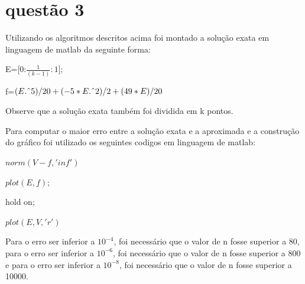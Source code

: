 \documentclass[a4paper]{article}
\begin{document}
  \section{questão 3}
  
  Utilizando os algoritmos descritos acima foi montado a solução exata em linguagem de matlab da seguinte forma:
  
  E=[0:\(\frac{1}{(k-1)}:1\)];
  
  f=\((E.\string^5)/20 +(-5*E.\string^2)/2 +(49*E)/20\) %
  
  Observe que a solução exata também foi dividida em k pontos.
  
  Para computar o maior erro entre a solução exata e a aproximada e a construção do gráfico foi utilizado os seguintes codigos em linguagem de matlab:

  \(norm(V-f,'inf')\)

  \(plot(E,f);\)

   hold on;

  \(plot(E,V,'r')\)

Para o erro ser inferior a \(10^{-4}\), foi necessário que o valor de n fosse superior a 80, para o erro ser inferior a \(10^{-6}\), foi necessário que o valor de n fosse superior a 800 e para o erro ser inferior a \(10^{-8}\), foi necessário que o valor de n fosse superior a 10000. \\ 
\end{document}
